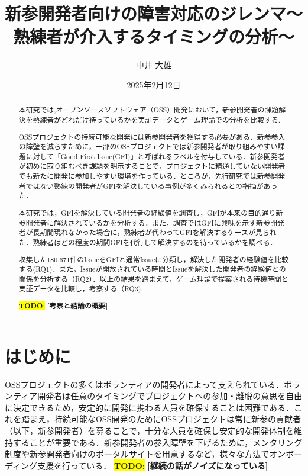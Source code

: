 \documentclass[11pt]{jreport}
\title{新参開発者向けの障害対応のジレンマ〜熟練者が介入するタイミングの分析〜}
\author{中井 大雄}
\date{2025年2月12日}	%
\newcommand{\NIssue}{180,671}
\newcommand{\todo}[1]{\colorbox{yellow}{{\bf TODO}:}{\color{red} {\textbf{[#1]}}}}
\begin{document}
\maketitle

\begin{abstract}
本研究では,オープンソースソフトウェア（OSS）開発において，新参開発者の課題解決を熟練者がどれだけ待っているかを実証データとゲーム理論での分析を比較する.

OSSプロジェクトの持続可能な開発には新参開発者を獲得する必要がある．新参参入の障壁を減らすために，一部のOSSプロジェクトでは新参開発者が取り組みやすい課題に対して「Good First Issue(GFI)」と呼ばれるラベルを付与している．新参開発者が初めに取り組むべき課題を明示することで，プロジェクトに精通していない開発者でも新たに開発に参加しやすい環境を作っている．ところが，先行研究では新参開発者ではない熟練の開発者がGFIを解決している事例が多くみられるとの指摘があった．

本研究では，GFIを解決している開発者の経験値を調査し，GFIが本来の目的通り新参開発者に解決されているかを分析する．また，調査ではGFIに興味を示す新参開発者が長期間現れなかった場合に，熟練者が代わってGFIを解決するケースが見られた．熟練者はどの程度の期間GFIを代行して解決するのを待っているかを調べる．

収集した\NIssue 件のIssueをGFIと通常Issueに分類し，解決した開発者の経験値を比較する(RQ1)．また，Issueが開放されている時間とIssueを解決した開発者の経験値との関係を分析する（RQ2）．以上の結果を踏まえて，ゲーム理論で提案される待機時間と実証データを比較し，考察する（RQ3).

\todo{考察と結論の概要}
\end{abstract}

\tableofcontents



\newpage
{}	%



\chapter{はじめに}

OSSプロジェクトの多くはボランティアの開発者によって支えられている\cite{definding}．ボランティア開発者は任意のタイミングでプロジェクトへの参加・離脱の意思を自由に決定できるため，安定的に開発に携わる人員を確保することは困難である．これを踏まえ，持続可能なOSS開発のためにOSSプロジェクトは常に新参の貢献者（以下，新参開発者）を募ることで，十分な人員を確保し安定的な開発体制を維持することが重要である．新参開発者の参入障壁を下げるために，メンタリング制度\cite{menter1}\cite{menter2}や新参開発者向けのポータルサイト\cite{portal}を用意するなど，様々な方法でオンボーディング支援を行っている．
\todo{継続の話がノイズになっている}
\end{document}
